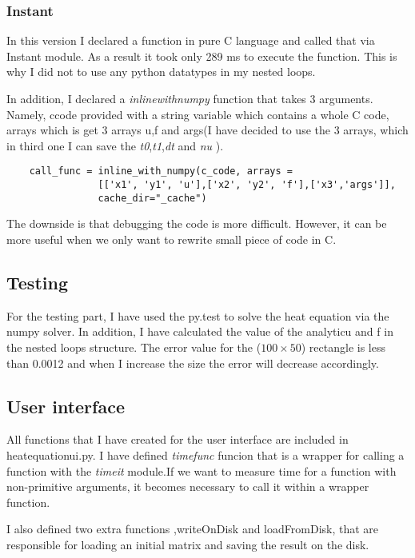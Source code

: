 \documentclass{article}
\begin{document}
\subsubsection{Instant}
In this version I declared a function in pure C language and called that via Instant module. As a result it took only 289 ms to execute the function. This is why I did not to use any python datatypes in my nested loops. 
\par
In addition, I declared a \textit{inline\textunderscore with\textunderscore numpy} function that takes 3 arguments. Namely, c\textunderscore code provided with a string variable which contains a whole C code, arrays which is get 3 arrays u,f and args(I have decided to use the 3 arrays, which in third one I can save the \textit{t0},\textit{t1},\textit{dt} and \textit{nu} ). 
\begin{verbatim}
    call_func = inline_with_numpy(c_code, arrays = 
    			[['x1', 'y1', 'u'],['x2', 'y2', 'f'],['x3','args']],
    			cache_dir="_cache")
\end{verbatim}
\par
The downside is that debugging the code is more difficult. However, it can be more useful when we only want to rewrite small piece of code in C.
\subsection{Testing}
For the testing part, I have used the py.test to solve the heat equation via the numpy solver. In addition, I have calculated the value of the analytic\textunderscore u and f in the nested loops structure. The error value for the ($100\times 50$) rectangle is less than 0.0012 and when I increase the size the error will decrease accordingly.
\subsection{User interface}

All functions that I have created for the user interface are included in heat\textunderscore equation\textunderscore ui.py. I have defined \textit{timefunc} funcion that is a wrapper for calling a function with the \textit{timeit} module.If we want to  measure time for a function with non-primitive arguments, it becomes necessary to call it within a wrapper function.

\par
I also defined two extra functions ,writeOnDisk and loadFromDisk, that are responsible for loading an initial matrix and saving the result on the disk.
\end{document}
